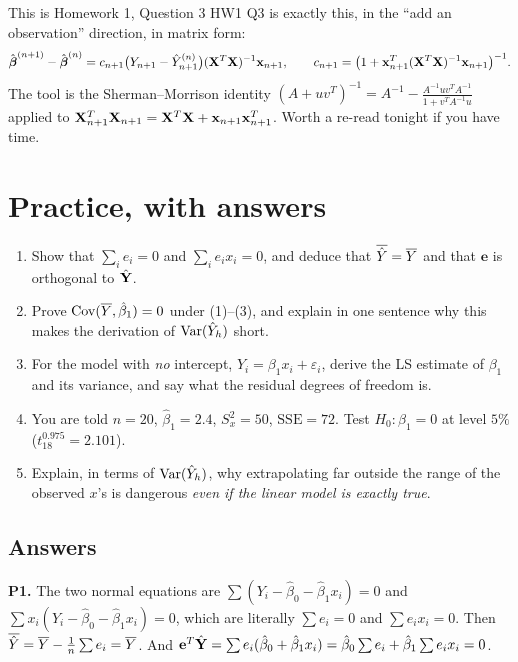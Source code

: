 \documentclass[11pt]{article}
\begin{document}
\begin{exam}{This is Homework 1, Question 3}
HW1 Q3 is exactly this, in the ``add an observation'' direction, in matrix form:
\[
  \hat{\boldsymbol{\beta}}^{(n+1)}-\hat{\boldsymbol{\beta}}^{(n)} = c_{n+1}\big(Y_{n+1}-\hat Y^{(n)}_{n+1}\big)(\mathbf{X}^T\mathbf{X})^{-1}\mathbf{x}_{n+1},
  \qquad c_{n+1}=\big(1+\mathbf{x}_{n+1}^T(\mathbf{X}^T\mathbf{X})^{-1}\mathbf{x}_{n+1}\big)^{-1}.
\]
The tool is the Sherman--Morrison identity
$(A+uv^T)^{-1}=A^{-1}-\frac{A^{-1}uv^TA^{-1}}{1+v^TA^{-1}u}$ applied to
$\mathbf{X}_{n+1}^T\mathbf{X}_{n+1}=\mathbf{X}^T\mathbf{X}+\mathbf{x}_{n+1}\mathbf{x}_{n+1}^T$. Worth a re-read
tonight if you have time.
\end{exam}

\section{Practice, with answers}

\begin{enumerate}[label=\textbf{P\arabic*.}]
\item Show that $\sum_i e_i = 0$ and $\sum_i e_ix_i=0$, and deduce that
      $\overline{\hat Y}=\overline{Y}$ and that $\mathbf{e}$ is orthogonal to $\hat{\mathbf{Y}}$.

\item Prove $\operatorname{Cov}(\overline{Y},\hat\beta_1)=0$ under (1)--(3), and explain in one sentence why this
      makes the derivation of $\operatorname{Var}(\hat Y_h)$ short.

\item For the model with \emph{no} intercept, $Y_i=\beta_1x_i+\varepsilon_i$, derive the LS
      estimate of $\beta_1$ and its variance, and say what the residual degrees of freedom is.

\item You are told $n=20$, $\hat\beta_1=2.4$, $S_x^2=50$, $\mathrm{SSE}=72$. Test
      $H_0:\beta_1=0$ at level $5\%$ ($t^{0.975}_{18}=2.101$).

\item Explain, in terms of $\operatorname{Var}(\hat Y_h)$, why extrapolating far outside the range of the
      observed $x$'s is dangerous \emph{even if the linear model is exactly true}.
\end{enumerate}

\subsection*{Answers}

\noindent\textbf{P1.} The two normal equations are $\sum(Y_i-\hat\beta_0-\hat\beta_1x_i)=0$
and $\sum x_i(Y_i-\hat\beta_0-\hat\beta_1x_i)=0$, which are literally $\sum e_i=0$ and
$\sum e_ix_i=0$. Then $\overline{\hat Y}=\overline{Y}-\frac1n\sum e_i=\overline{Y}$. And
$\mathbf{e}^T\hat{\mathbf{Y}}=\sum e_i(\hat\beta_0+\hat\beta_1x_i)=\hat\beta_0\sum e_i+\hat\beta_1\sum e_ix_i=0$.
\end{document}
